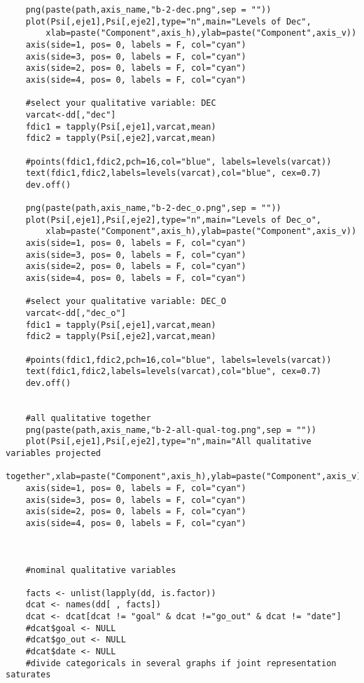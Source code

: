 \begin{verbatim}
    png(paste(path,axis_name,"b-2-dec.png",sep = ""))
    plot(Psi[,eje1],Psi[,eje2],type="n",main="Levels of Dec",
        xlab=paste("Component",axis_h),ylab=paste("Component",axis_v))
    axis(side=1, pos= 0, labels = F, col="cyan")
    axis(side=3, pos= 0, labels = F, col="cyan")
    axis(side=2, pos= 0, labels = F, col="cyan")
    axis(side=4, pos= 0, labels = F, col="cyan")
    
    #select your qualitative variable: DEC
    varcat<-dd[,"dec"]
    fdic1 = tapply(Psi[,eje1],varcat,mean)
    fdic2 = tapply(Psi[,eje2],varcat,mean)
    
    #points(fdic1,fdic2,pch=16,col="blue", labels=levels(varcat))
    text(fdic1,fdic2,labels=levels(varcat),col="blue", cex=0.7)
    dev.off()
    
    png(paste(path,axis_name,"b-2-dec_o.png",sep = ""))
    plot(Psi[,eje1],Psi[,eje2],type="n",main="Levels of Dec_o",
        xlab=paste("Component",axis_h),ylab=paste("Component",axis_v))
    axis(side=1, pos= 0, labels = F, col="cyan")
    axis(side=3, pos= 0, labels = F, col="cyan")
    axis(side=2, pos= 0, labels = F, col="cyan")
    axis(side=4, pos= 0, labels = F, col="cyan")
    
    #select your qualitative variable: DEC_O
    varcat<-dd[,"dec_o"]
    fdic1 = tapply(Psi[,eje1],varcat,mean)
    fdic2 = tapply(Psi[,eje2],varcat,mean)
    
    #points(fdic1,fdic2,pch=16,col="blue", labels=levels(varcat))
    text(fdic1,fdic2,labels=levels(varcat),col="blue", cex=0.7)
    dev.off()
    
    
    #all qualitative together
    png(paste(path,axis_name,"b-2-all-qual-tog.png",sep = ""))
    plot(Psi[,eje1],Psi[,eje2],type="n",main="All qualitative variables projected
        together",xlab=paste("Component",axis_h),ylab=paste("Component",axis_v))
    axis(side=1, pos= 0, labels = F, col="cyan")
    axis(side=3, pos= 0, labels = F, col="cyan")
    axis(side=2, pos= 0, labels = F, col="cyan")
    axis(side=4, pos= 0, labels = F, col="cyan")
    
    
    
    #nominal qualitative variables
    
    facts <- unlist(lapply(dd, is.factor))  
    dcat <- names(dd[ , facts])
    dcat <- dcat[dcat != "goal" & dcat !="go_out" & dcat != "date"]
    #dcat$goal <- NULL
    #dcat$go_out <- NULL
    #dcat$date <- NULL
    #divide categoricals in several graphs if joint representation saturates
    

\end{verbatim}
